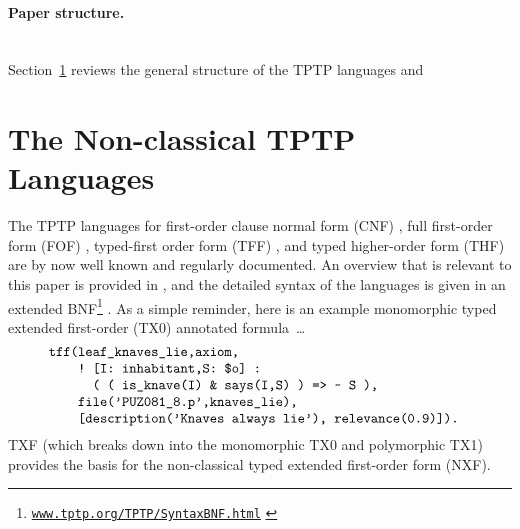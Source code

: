 \documentclass[runningheads]{llncs}
\begin{document}
\paragraph{Paper structure.}~\\
Section~\ref{TPTPLanguages} reviews the general structure of the TPTP languages and

\section{The Non-classical TPTP Languages}
\label{TPTPLanguages}

The TPTP languages for first-order clause normal form (CNF) \cite{SS98-JAR}, full first-order 
form (FOF) \cite{Sut09}, typed-first order form (TFF) \cite{SS+12,BP13-TFF1}, and typed 
higher-order form (THF) \cite{SB10,KSR16} are by now well known and regularly documented.
An overview that is relevant to this paper is provided in \cite{SF+22}, and the detailed
syntax of the languages is given in an extended BNF\footnote{%
\href{https://www.tptp.org/TPTP/SyntaxBNF.html}{\tt www.tptp.org/TPTP/SyntaxBNF.html}
\label{BNF}} \cite{VS06}.
As a simple reminder, here is an example monomorphic typed extended first-order (TX0) annotated 
formula~\ldots
\[
\begin{minipage}{\textwidth}
\begin{verbatim}
    tff(leaf_knaves_lie,axiom,
        ! [I: inhabitant,S: $o] : 
          ( ( is_knave(I) & says(I,S) ) => ~ S ),
        file('PUZ081_8.p',knaves_lie),
        [description('Knaves always lie'), relevance(0.9)]).
\end{verbatim}
\end{minipage}
\]
TXF (which breaks down into the monomorphic TX0 and polymorphic TX1) provides the basis for the 
non-classical typed extended first-order form (NXF).
\end{document}
